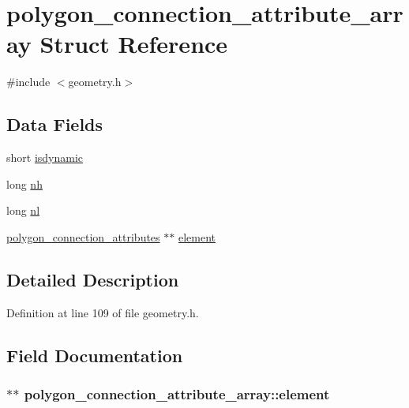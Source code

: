\hypertarget{structpolygon__connection__attribute__array}{\section{polygon\-\_\-connection\-\_\-attribute\-\_\-array Struct Reference}
\label{structpolygon__connection__attribute__array}
}


{\ttfamily \#include $<$geometry.\-h$>$}

\subsection*{Data Fields}
\begin{DoxyCompactItemize}
\item 
short \hyperlink{structpolygon__connection__attribute__array_a388b4a162beb023bbf07666c1d0ef4a7}{isdynamic}
\item 
long \hyperlink{structpolygon__connection__attribute__array_afc94c84e7a1941584da24c59dabcaedc}{nh}
\item 
long \hyperlink{structpolygon__connection__attribute__array_ad86966f39e50790c435874dfc6918e71}{nl}
\item 
\hyperlink{structpolygon__connection__attributes}{polygon\-\_\-connection\-\_\-attributes} $\ast$$\ast$ \hyperlink{structpolygon__connection__attribute__array_a48044b0ff673e56f31f102d983e4a91b}{element}
\end{DoxyCompactItemize}


\subsection{Detailed Description}


Definition at line 109 of file geometry.\-h.



\subsection{Field Documentation}
\hypertarget{structpolygon__connection__attribute__array_a48044b0ff673e56f31f102d983e4a91b}{
\subsubsection[{element}]{$\ast$$\ast$ polygon\-\_\-connection\-\_\-attribute\-\_\-array\-::element}}\label{structpolygon__connection__attribute__array_a48044b0ff673e56f31f102d983e4a91b}


